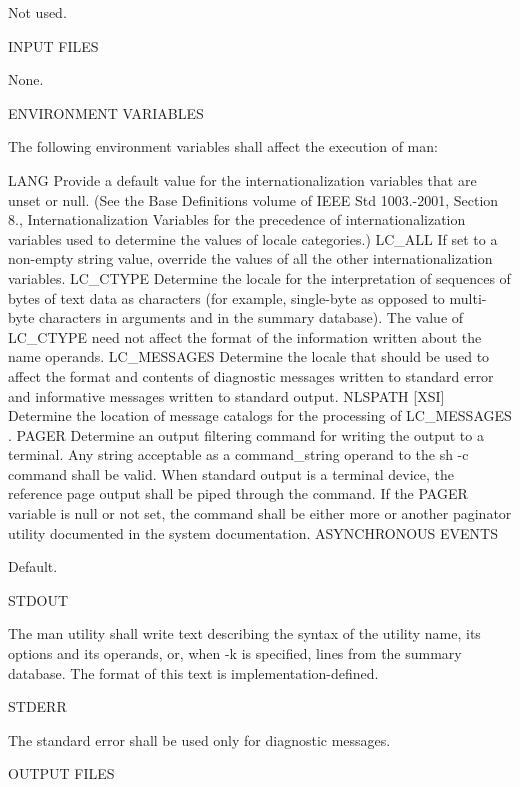 Not used.

I\-N\-P\-U\-T F\-I\-L\-E\-S

None.

E\-N\-V\-I\-R\-O\-N\-M\-E\-N\-T V\-A\-R\-I\-A\-B\-L\-E\-S

The following environment variables shall affect the execution of man\-:

L\-A\-N\-G Provide a default value for the internationalization variables that are unset or null. (See the Base Definitions volume of I\-E\-E\-E Std 1003.-\/2001, Section 8., Internationalization Variables for the precedence of internationalization variables used to determine the values of locale categories.) L\-C\-\_\-\-A\-L\-L If set to a non-\/empty string value, override the values of all the other internationalization variables. L\-C\-\_\-\-C\-T\-Y\-P\-E Determine the locale for the interpretation of sequences of bytes of text data as characters (for example, single-\/byte as opposed to multi-\/byte characters in arguments and in the summary database). The value of L\-C\-\_\-\-C\-T\-Y\-P\-E need not affect the format of the information written about the name operands. L\-C\-\_\-\-M\-E\-S\-S\-A\-G\-E\-S Determine the locale that should be used to affect the format and contents of diagnostic messages written to standard error and informative messages written to standard output. N\-L\-S\-P\-A\-T\-H \mbox{[}X\-S\-I\mbox{]} Determine the location of message catalogs for the processing of L\-C\-\_\-\-M\-E\-S\-S\-A\-G\-E\-S . P\-A\-G\-E\-R Determine an output filtering command for writing the output to a terminal. Any string acceptable as a command\-\_\-string operand to the sh -\/c command shall be valid. When standard output is a terminal device, the reference page output shall be piped through the command. If the P\-A\-G\-E\-R variable is null or not set, the command shall be either more or another paginator utility documented in the system documentation. A\-S\-Y\-N\-C\-H\-R\-O\-N\-O\-U\-S E\-V\-E\-N\-T\-S

Default.

S\-T\-D\-O\-U\-T

The man utility shall write text describing the syntax of the utility name, its options and its operands, or, when -\/k is specified, lines from the summary database. The format of this text is implementation-\/defined.

S\-T\-D\-E\-R\-R

The standard error shall be used only for diagnostic messages.

O\-U\-T\-P\-U\-T F\-I\-L\-E\-S

